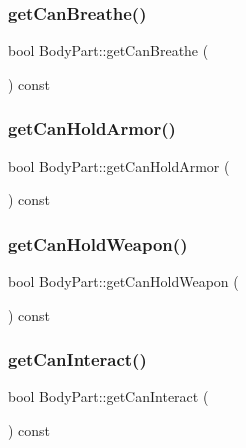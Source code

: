 \subsubsection{\texorpdfstring{get\+Can\+Breathe()}{getCanBreathe()}}
{\footnotesize\ttfamily bool Body\+Part\+::get\+Can\+Breathe (\begin{DoxyParamCaption}{ }\end{DoxyParamCaption}) const}

\mbox{\label{class_body_part_a0be339561a54fa3dbff4ebc27f4b3c4c}} 
\subsubsection{\texorpdfstring{get\+Can\+Hold\+Armor()}{getCanHoldArmor()}}
{\footnotesize\ttfamily bool Body\+Part\+::get\+Can\+Hold\+Armor (\begin{DoxyParamCaption}{ }\end{DoxyParamCaption}) const}

\mbox{\label{class_body_part_a9982b6e93c9168734960e9f334acdece}} 
\subsubsection{\texorpdfstring{get\+Can\+Hold\+Weapon()}{getCanHoldWeapon()}}
{\footnotesize\ttfamily bool Body\+Part\+::get\+Can\+Hold\+Weapon (\begin{DoxyParamCaption}{ }\end{DoxyParamCaption}) const}

\mbox{\label{class_body_part_a9a53de5a283928eb78986c3195d0f1b9}} 
\subsubsection{\texorpdfstring{get\+Can\+Interact()}{getCanInteract()}}
{\footnotesize\ttfamily bool Body\+Part\+::get\+Can\+Interact (\begin{DoxyParamCaption}{ }\end{DoxyParamCaption}) const}


